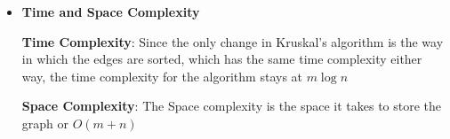 \documentclass[letterpaper,11pt]{article}
\begin{document}
\begin{enumerate}
\begin{enumerate}
\begin{itemize}
                \item \textbf{Time and Space Complexity}
                    
                    \textbf{Time Complexity}: Since the only change in Kruskal's algorithm is the 
                    way in which the edges are sorted, which has the same time
                    complexity either way, the time complexity for the algorithm
                    stays at $m\log{n}$

                    \textbf{Space Complexity}: The Space complexity is the space
                    it takes to store the graph or $O\left( m + n \right) $


            \end{itemize}
            


    \end{enumerate}


\end{enumerate}
\end{document}
